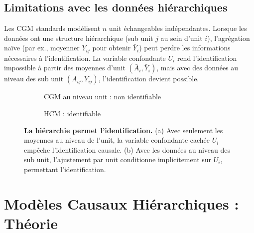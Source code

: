 \documentclass[11pt,a4paper]{article}
\begin{document}
\subsection{Limitations avec les données hiérarchiques}

Les CGM standards modélisent $n$ unit échangeables indépendantes.
Lorsque les données ont une structure hiérarchique (sub unit $j$ au sein d'unit $i$), l'agrégation naïve (par ex., moyenner $Y_{ij}$ pour obtenir $\bar{Y}_i$) peut perdre les informations nécessaires à l'identification.
La variable confondante $U_i$ rend l'identification impossible à partir des moyennes d'unit $(\bar{A}_i, \bar{Y}_i)$, mais avec des données au niveau des sub unit $(A_{ij}, Y_{ij})$, l'identification devient possible.

\begin{figure}[h!]
\centering
\begin{subfigure}[c]{0.40\textwidth}
\caption{CGM au niveau unit : non identifiable} \label{fig:intro_flat}
\centering
{}
\end{subfigure}
\hfill
\begin{subfigure}[c]{0.45\textwidth}
\caption{HCM : identifiable} \label{fig:intro_hcm}
\centering
{}
\end{subfigure}
\caption{\textbf{La hiérarchie permet l'identification.} (a) Avec seulement les moyennes au niveau de l'unit, la variable confondante cachée $U_i$ empêche l'identification causale. (b) Avec les données au niveau des sub unit, l'ajustement par unit conditionne implicitement sur $U_i$, permettant l'identification.}
\label{fig:hierarchy_enables}
\end{figure}

\section{Modèles Causaux Hiérarchiques : Théorie}
\label{sec:hcm_theory}
\end{document}
